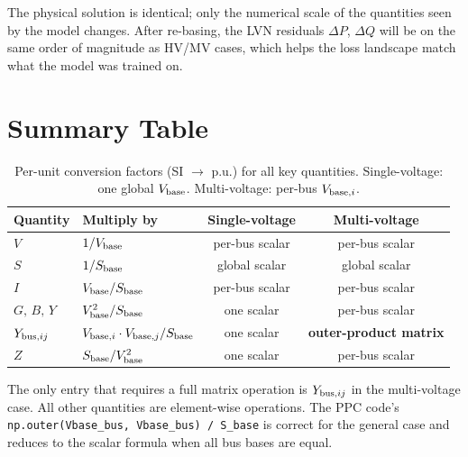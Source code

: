 \documentclass{article}
\begin{document}
The physical solution is identical; only the numerical scale of the
quantities seen by the model changes.  After re-basing, the LVN residuals
$\Delta P$, $\Delta Q$ will be on the same order of magnitude as HV/MV
cases, which helps the loss landscape match what the model was trained on.

\section{Summary Table}

\begin{table}[h]
\centering
\caption{Per-unit conversion factors (SI $\to$ p.u.) for all key quantities.
  Single-voltage: one global $V_{\rm base}$.
  Multi-voltage: per-bus $V_{{\rm base},i}$.}
\label{tab:pu_summary}
\begin{tabular}{llcc}
\toprule
Quantity & Multiply by & Single-voltage & Multi-voltage \\
\midrule
$V$          & $1/V_{\rm base}$
             & per-bus scalar & per-bus scalar \\
$S$          & $1/S_{\rm base}$
             & global scalar  & global scalar \\
$I$          & $V_{\rm base}/S_{\rm base}$
             & per-bus scalar & per-bus scalar \\
$G,\,B,\,Y$ & $V_{\rm base}^2/S_{\rm base}$
             & one scalar     & per-bus scalar \\
$Y_{{\rm bus},ij}$ & $V_{{\rm base},i}\cdot V_{{\rm base},j}/S_{\rm base}$
             & one scalar     & \textbf{outer-product matrix} \\
$Z$          & $S_{\rm base}/V_{\rm base}^2$
             & one scalar     & per-bus scalar \\
\bottomrule
\end{tabular}
\end{table}

The only entry that requires a full matrix operation is
$Y_{{\rm bus},ij}$ in the multi-voltage case.  All other quantities are
element-wise operations.  The PPC code's
\texttt{np.outer(Vbase\_bus, Vbase\_bus)\,/\,S\_base} is correct for the
general case and reduces to the scalar formula when all bus bases are equal.
\end{document}
